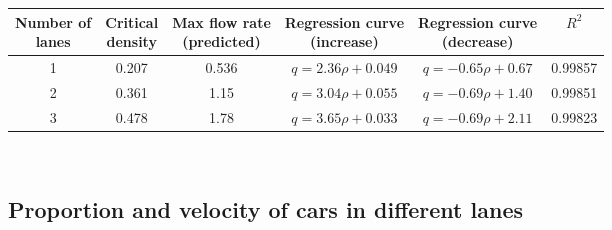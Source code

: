 \documentclass[a4paper,12pt]{article}
\begin{document}
\begin{center}
\def\arraystretch{1.5}
\begin{tabular}{ |c|c|c|c|c|c| } 
 \hline
	\makecell{Number of \\lanes} & \makecell{Critical\\ density} &\makecell{Max flow rate \\ (predicted)} & \makecell{Regression curve \\(increase)} & \makecell{Regression curve \\(decrease)} & $R^2$ \\
 \hline
	 1 & 0.207 & 0.536 &$q=2.36\rho+0.049$ & $q=-0.65\rho+0.67$ & 0.99857  \\
	 2 & 0.361 & 1.15 &$q=3.04\rho+0.055$ & $q=-0.69\rho+1.40$  & 0.99851 \\
	 3 & 0.478 & 1.78 &$q=3.65\rho+0.033$ & $q=-0.69\rho+2.11$ & 0.99823 \\
 \hline
\end{tabular}\\
\end{center}


\subsection{Proportion and velocity of cars in different lanes}
\end{document}
